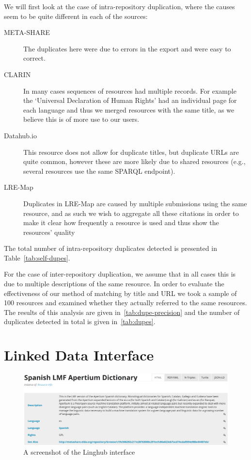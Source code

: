 \documentclass[smallextended]{svjour3}       %
\begin{document}
We will first look at the case of intra-repository duplication, where the causes
seem to be quite different in each of the sources:

\begin{description}
    \item[META-SHARE] The duplicates here were due to errors in the export and
        were easy to correct.
    \item[CLARIN] In many cases sequences of resources had multiple records. For
        example the `Universal Declaration of Human Rights' had an individual
        page for each language and thus we merged resources with the same title,
        as we believe this is of more use to our users.
    \item[Datahub.io] This resource does not allow for duplicate titles, but
        duplicate URLs are quite common, however these are more likely due to
        shared resources (e.g., several resources use the same SPARQL endpoint).
    \item[LRE-Map] Duplicates in LRE-Map are caused by multiple submissions
        using the same resource, and as such we wish to aggregate all these
        citations in order to make it clear how frequently a resource is used
        and thus show the resources' quality
\end{description}

The total number of intra-repository duplicates detected is presented in Table~\ref{tab:self-dupes}.

For the case of inter-repository duplication, we assume that in all cases this
is due to multiple descriptions of the same resource. In order to evaluate the
effectiveness of our method of matching by title and URL we took a sample of 100
resources and examined whether they actually referred to the same resources. The
results of this analysis are given in~\ref{tab:dupe-precision} and the number of
duplicates detected in total is given in~\ref{tab:dupes}.


\section{Linked Data Interface}
\label{linked-data-interface}


\begin{figure}
\includegraphics[width=\textwidth]{linghub-screenshot.png}
\caption{A screenshot of the Linghub interface\label{fig:screenshot}}
\end{figure}
\end{document}
